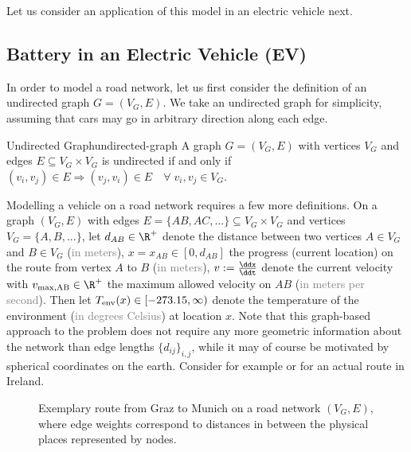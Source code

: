 \documentclass{prettytex/ox/mmsc-special-topic}
\begin{document}
  Let us consider an application of this model in an electric vehicle next.

  \subsection{Battery in an Electric Vehicle (EV)}
  In order to model a road network, let us first consider the definition of an undirected graph $G = (V_G, E)$. We take an undirected graph for simplicity, assuming that cars may go in arbitrary direction along each edge.
  \begin{definition}{Undirected Graph}{undirected-graph}
    A graph $G = (V_G, E)$ with vertices $V_G$ and edges $E \subseteq V_G \times V_G$ is undirected if and only if $(v_i, v_j) \in E \Rightarrow (v_j, v_i) \in E \quad \forall\; v_i, v_j \in V_G$.
  \end{definition}

  Modelling a vehicle on a road network requires a few more definitions.
  On a graph $(V_G, E)$ with edges $E = \{AB, AC, ...\} \subseteq V_G \times V_G$ and vertices $V_G = \{A, B, ...\}$, let
  $d_{AB} \in \R^+$ denote the distance between two vertices $A \in V_G$ and $B \in V_G$ (\textcolor{gray}{in meters}),
  $x = x_{AB} \in [0, d_{AB}]$ the progress (current location) on the route from vertex $A$ to $B$ (\textcolor{gray}{in meters}),
  $v := \frac{\ddx}{\ddt}$ denote the current velocity with
  $v_{\rm max, AB} \in \R^+$ the maximum allowed velocity on $AB$ (\textcolor{gray}{in meters per second}).
  Then let
  $T_{\rm env}(x) \in [-273.15, \infty)$ denote the temperature of the environment (\textcolor{gray}{in degrees Celsius}) at location $x$.
  Note that this graph-based approach to the problem does not require any more geometric information about the network than edge lengths $\{d_{ij}\}_{i,j}$, while it may of course be motivated by spherical coordinates on the earth.
  Consider for example  or  for an actual route in Ireland.

  \begin{figure}[H]
    \centering
    \caption{Exemplary route from Graz to Munich on a road network $(V_G, E)$, where edge weights correspond to distances in between the physical places represented by nodes.}
    \label{fig:graz-to-munich}
  \end{figure}
\end{document}

